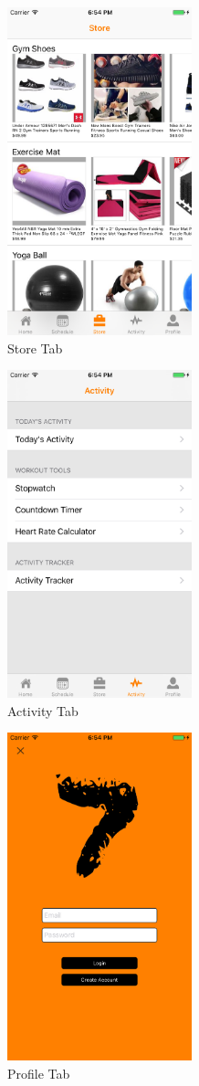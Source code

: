 \begin{center}
\includegraphics[width=0.4\textwidth]{img/store_screen} \\
Store Tab \\
\vfill

\includegraphics[width=0.4\textwidth]{img/activity_screen} \\
Activity  Tab \\
\vfill

\includegraphics[width=0.4\textwidth]{img/profile_screen} \\
Profile Tab \\
\vfill

\end{center}